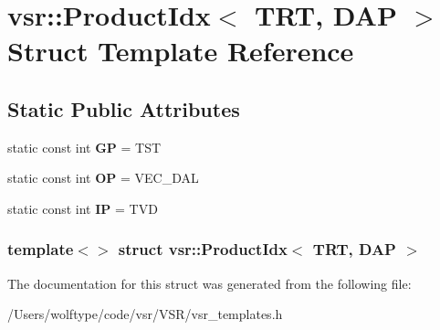 \hypertarget{structvsr_1_1_product_idx_3_01_t_r_t_00_01_d_a_p_01_4}{\section{vsr\-:\-:Product\-Idx$<$ T\-R\-T, D\-A\-P $>$ Struct Template Reference}
\label{structvsr_1_1_product_idx_3_01_t_r_t_00_01_d_a_p_01_4}
}
\subsection*{Static Public Attributes}
\begin{DoxyCompactItemize}
\item 
\hypertarget{structvsr_1_1_product_idx_3_01_t_r_t_00_01_d_a_p_01_4_adf1ee3637ea9c26e2ddd9535a1444add}{static const int {\bfseries G\-P} = T\-S\-T}\label{structvsr_1_1_product_idx_3_01_t_r_t_00_01_d_a_p_01_4_adf1ee3637ea9c26e2ddd9535a1444add}

\item 
\hypertarget{structvsr_1_1_product_idx_3_01_t_r_t_00_01_d_a_p_01_4_a9c791b9e69e0ebcacf2a4bd3f97fa0b4}{static const int {\bfseries O\-P} = V\-E\-C\-\_\-\-D\-A\-L}\label{structvsr_1_1_product_idx_3_01_t_r_t_00_01_d_a_p_01_4_a9c791b9e69e0ebcacf2a4bd3f97fa0b4}

\item 
\hypertarget{structvsr_1_1_product_idx_3_01_t_r_t_00_01_d_a_p_01_4_af75a9d484935ea496910eab658ce5947}{static const int {\bfseries I\-P} = T\-V\-D}\label{structvsr_1_1_product_idx_3_01_t_r_t_00_01_d_a_p_01_4_af75a9d484935ea496910eab658ce5947}

\end{DoxyCompactItemize}
\subsubsection*{template$<$$>$ struct vsr\-::\-Product\-Idx$<$ T\-R\-T, D\-A\-P $>$}



The documentation for this struct was generated from the following file\-:\begin{DoxyCompactItemize}
\item 
/\-Users/wolftype/code/vsr/\-V\-S\-R/vsr\-\_\-templates.\-h\end{DoxyCompactItemize}
